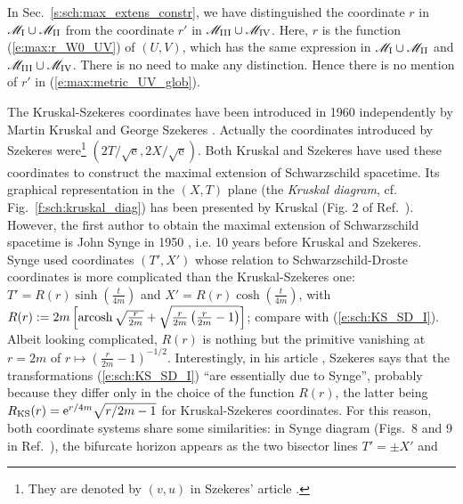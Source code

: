 \begin{remark}
In Sec.~\ref{s:sch:max_extens_constr}, we have distinguished the
coordinate
$r$ in $\mathscr{M}_{\rm I}\cup \mathscr{M}_{\rm II}$ from the coordinate $r'$ in
$\mathscr{M}_{\rm III}\cup \mathscr{M}_{\rm IV}$. Here, $r$ is the function
(\ref{e:max:r_W0_UV}) of $(U,V)$, which has the same expression in
$\mathscr{M}_{\rm I}\cup \mathscr{M}_{\rm II}$ and $\mathscr{M}_{\rm III}\cup \mathscr{M}_{\rm IV}$. There is
no need to make any distinction. Hence there is no mention of $r'$
in (\ref{e:max:metric_UV_glob}).
\end{remark}


\begin{hist}
\label{n:max:KS_coord}
The Kruskal-Szekeres coordinates have been introduced in 1960 independently
by Martin Kruskal \cite{Krusk60} and
George Szekeres \cite{Szeke60}.
Actually the coordinates
introduced by Szekeres were\footnote{They are denoted by $(v,u)$ in Szekeres' article \cite{Szeke60}.} $(2T/\sqrt{\mathrm{e}}, 2X/\sqrt{\mathrm{e}})$. Both Kruskal and Szekeres
have used these coordinates to construct the maximal  extension of Schwarzschild
spacetime. Its graphical representation in the $(X,T)$ plane (the
\emph{Kruskal diagram}, cf. Fig.~\ref{f:sch:kruskal_diag}) has been presented by
Kruskal (Fig. 2 of Ref.~\cite{Krusk60}).
However, the first author to obtain the maximal extension of Schwarzschild spacetime is
John Synge in 1950 \cite{Synge50}, i.e. 10 years before Kruskal and Szekeres.
Synge used coordinates $(T',X')$
whose relation to
Schwarzschild-Droste coordinates is more complicated than the Kruskal-Szekeres one:
$T' = R(r) \sinh \left(\frac{t}{4m}\right)$
and $X' = R(r) \cosh \left(\frac{t}{4m}\right)$, with
$R(r) := 2m \left[ \operatorname{arcosh}\sqrt{\frac{r}{2m}} + \sqrt{ \frac{r}{2m}\left(\frac{r}{2m} - 1 \right) }\right]$; compare with (\ref{e:sch:KS_SD_I}).
Albeit looking complicated, $R(r)$ is nothing but the primitive vanishing at
$r=2m$ of $r\mapsto \left(\frac{r}{2m} - 1 \right) ^{-1/2}$.
Interestingly, in his
article \cite{Szeke60}, Szekeres says that the transformations (\ref{e:sch:KS_SD_I})
``are essentially due to Synge'', probably because they differ only in the choice
of the function $R(r)$, the latter being
$R_{\rm KS}(r) = \mathrm{e}^{r/4m} \sqrt{r/2m-1}$ for Kruskal-Szekeres coordinates.
For this reason, both coordinate systems share some similarities: in Synge diagram (Figs.~8 and 9 in Ref.~\cite{Synge50}),
the bifurcate horizon appears as the two bisector lines $T' = \pm X'$ and

\end{hist}
